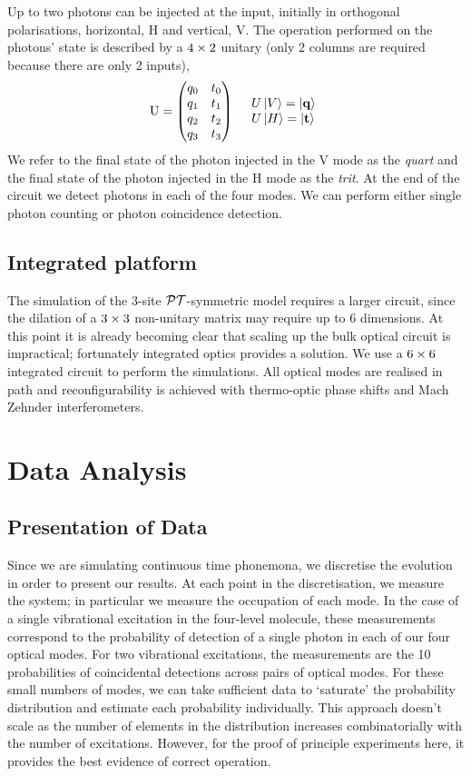 Up to two photons can be injected at the input, initially in orthogonal
polarisations, horizontal, H and vertical, V. The operation performed on the
photons' state is described by a \(4 \times 2\) unitary (only 2 columns are
required because there are only 2 inputs),
\begin{align}
  \mathrm{U} = \begin{pmatrix}
    q_{0} & t_{0} \\
    q_{1} & t_{1} \\
    q_{2} & t_{2} \\
    q_{3} & t_{3}
  \end{pmatrix} && \begin{array}{l}
    U \left|V\right\rangle = \left|\mathbf{q}\right\rangle \\
    U \left|H\right\rangle = \left|\mathbf{t}\right\rangle
  \end{array}
\end{align}
We refer to the final state of the photon injected in the V mode as
the \emph{quart} and the final state of the photon injected in the H
mode as the \emph{trit}. At the end of the circuit we detect photons in each of
the four modes. We can perform either single photon counting or photon
coincidence detection.

\subsection{Integrated platform}
The simulation of the 3-site \(\mathcal{PT}\)-symmetric model requires a larger circuit,
since the dilation of a \(3 \times 3\) non-unitary matrix may require up to 6
dimensions. At this point it is already becoming clear that scaling up the bulk
optical circuit is impractical; fortunately integrated optics provides a
solution. We use a \(6 \times 6\) integrated circuit to perform the simulations.
All optical modes are realised in path and reconfigurability is achieved with
thermo-optic phase shifts and Mach Zehnder interferometers.

\section{Data Analysis}
\subsection{Presentation of Data}
Since we are simulating continuous time phonemona, we discretise the evolution
in order to present our results. At each point in the discretisation, we measure
the system; in particular we measure the occupation of each mode. In the case of
a single vibrational excitation in the four-level molecule, these measurements
correspond to the probability of detection of a single photon in each of our
four optical modes. For two vibrational excitations, the measurements are
the 10 probabilities of coincidental detections across pairs of optical modes.
For these small numbers of modes, we can take sufficient data to `saturate' the
probability distribution and estimate each probability individually. This
approach doesn't scale as the number of elements in the distribution increases
combinatorially with the number of excitations. However, for the proof of
principle experiments here, it provides the best evidence of correct operation.

